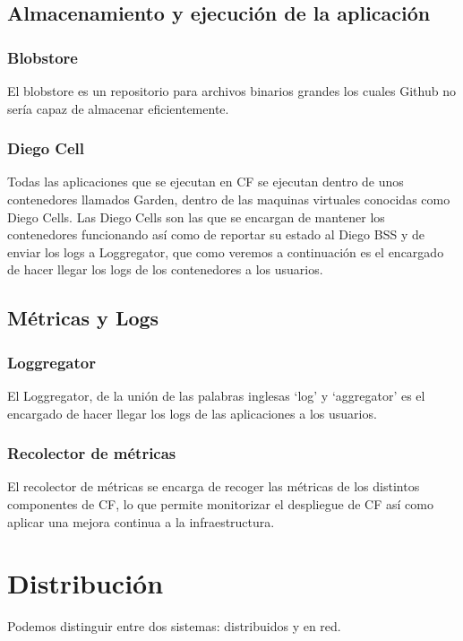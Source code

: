 \documentclass[a4paper,11pt]{article}
\begin{document}
\subsection{Almacenamiento y ejecución de la aplicación}
\subsubsection{Blobstore}
El blobstore es un repositorio para archivos binarios grandes los cuales Github no sería capaz de almacenar eficientemente.

\subsubsection{Diego Cell}\label{sec:DiegoCell}
Todas las aplicaciones que se ejecutan en CF se ejecutan dentro de unos contenedores llamados Garden, dentro de las maquinas virtuales conocidas como Diego Cells. Las Diego Cells son las que se encargan de mantener los contenedores funcionando así como de reportar su estado al Diego BSS y de enviar los logs a Loggregator, que como veremos a continuación es el encargado de hacer llegar los logs de los contenedores a los usuarios.

\subsection{Métricas y Logs}
\subsubsection{Loggregator}
El Loggregator, de la unión de las palabras inglesas `log' y `aggregator' es el encargado de hacer llegar los logs de las aplicaciones a los usuarios.
\subsubsection{Recolector de métricas}
El recolector de métricas se encarga de recoger las métricas de los distintos componentes de CF, lo que permite monitorizar el despliegue de CF así como aplicar una mejora continua a la infraestructura.




\section{Distribución}%
Podemos distinguir entre dos sistemas: distribuidos y en red.
\end{document}

